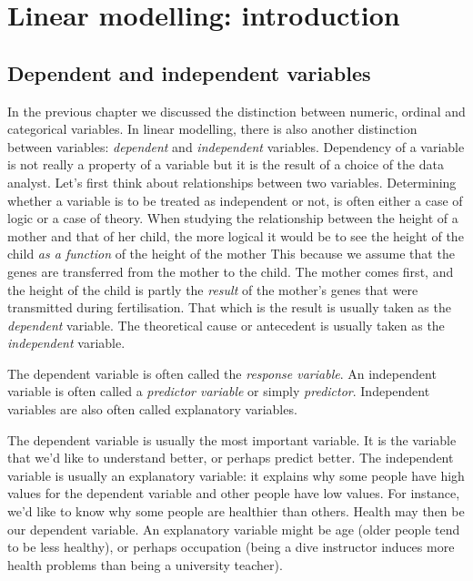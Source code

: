 \documentclass[]{book}\usepackage[]{graphicx}\usepackage[]{color}
\begin{document}


\chapter{Linear modelling: introduction}\label{chap:simple}



\section{Dependent and independent variables}
In the previous chapter we discussed the distinction between numeric, ordinal and categorical variables. In linear modelling, there is also another distinction between variables: \textit{dependent} and \textit{independent} variables. Dependency of a variable is not really a property of a variable but it is the result of a choice of the data analyst. Let's first think about relationships between two variables. Determining whether a variable is to be treated as independent or not, is often either a case of logic or a case of theory. When studying the relationship between the height of a mother and that of her child, the more logical it would be to see the height of the child \textit{as a function} of the height of the mother This because we assume that the genes are transferred from the mother to the child. The mother comes first, and the height of the child is partly the \textit{result} of the mother's genes that were transmitted during fertilisation. That which is the result is usually taken as the \textit{dependent} variable. The theoretical cause or antecedent is usually taken as the \textit{independent} variable. 

The dependent variable is often called the \textit{response variable}. An independent variable is often called a \textit{predictor variable} or simply \textit{predictor}. Independent variables are also often called explanatory variables.

The dependent variable is usually the most important variable. It is the variable that we'd like to understand better, or perhaps predict better. The independent variable is usually an explanatory variable: it explains why some people have high values for the dependent variable and other people have low values. For instance, we'd like to know why some people are healthier than others. Health may then be our dependent variable. An explanatory variable might be age (older people tend to be less healthy), or perhaps occupation (being a dive instructor induces more health problems than being a university teacher). 
\end{document}
